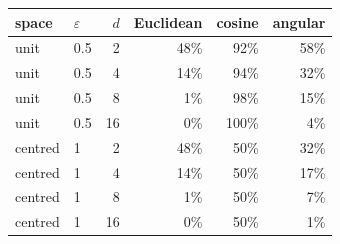 \begin{tabular}{llrrrr}
\toprule
space & $\varepsilon$ & $d$ & Euclidean & cosine & angular \\
\midrule
unit & 0.5 & 2 & 48\% & 92\% & 58\% \\
unit & 0.5 & 4 & 14\% & 94\% & 32\% \\
unit & 0.5 & 8 & 1\% & 98\% & 15\% \\
unit & 0.5 & 16 & 0\% & 100\% & 4\% \\
centred & 1 & 2 & 48\% & 50\% & 32\% \\
centred & 1 & 4 & 14\% & 50\% & 17\% \\
centred & 1 & 8 & 1\% & 50\% & 7\% \\
centred & 1 & 16 & 0\% & 50\% & 1\% \\
\bottomrule
\end{tabular}
